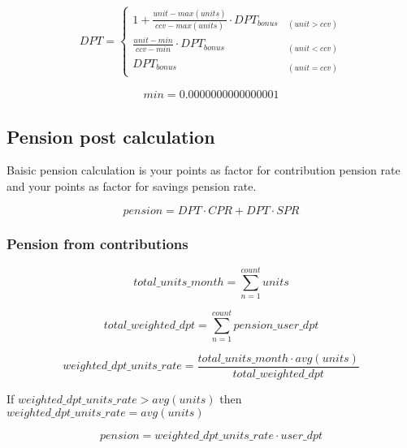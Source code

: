 \begin{equation}
DPT = \begin{cases} 
1 + \frac{unit-max(units)} {ccv - max(units)} 
 \cdot DPT_{bonus} & _{(unit > ccv)} \\
\frac{unit - min} {ccv - min} 
 \cdot DPT_{bonus} & _{(unit < ccv)} \\
DPT_{bonus} & _{(unit = ccv)}
\end{cases}
\end{equation}

\begin{eqnarray}
	min = 0.0000000000000001
\end{eqnarray}



\newpage

\subsection{Pension post calculation}

Baisic pension calculation is your points
as factor for contribution pension rate and 
your points as factor for savings pension rate.

\begin{equation}
pension = DPT \cdot CPR + DPT \cdot SPR
\end{equation}

\subsubsection*{Pension from contributions}

\begin{equation}
	total\_units\_month = 
	\sum_{n=1}^{count} units
\end{equation}

\begin{equation}
	total\_weighted\_dpt = 
	\sum_{n=1}^{count} pension\_user\_dpt
\end{equation}

\begin{equation}
	weighted\_dpt\_units\_rate = 	
	\frac{total\_units\_month  \cdot avg(units)} 
	{total\_weighted\_dpt}		
\end{equation}

If $weighted\_dpt\_units\_rate > avg(units)$ then $weighted\_dpt\_units\_rate = avg(units)$
        

\begin{equation}
	pension = 	
	weighted\_dpt\_units\_rate \cdot user\_dpt
\end{equation}


